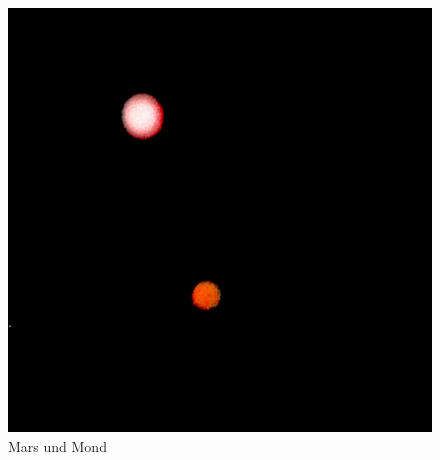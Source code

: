 \documentclass{scrartcl}
\begin{document}
\begin{figure}[hbt]
\includegraphics[height=.20\textheight]{Image}
\caption{Mars und Mond}
\end{figure}
\end{document}
